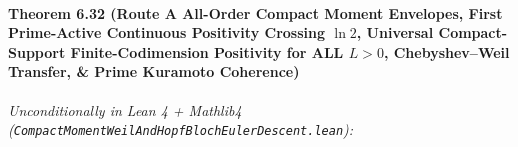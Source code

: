 \documentclass[
  11pt,
]{article}
\begin{document}
\paragraph{\texorpdfstring{Theorem 6.32 (Route A All-Order Compact
Moment Envelopes, First Prime-Active Continuous Positivity Crossing
\(\ln 2\), Universal Compact-Support Finite-Codimension Positivity for
ALL \(L > 0\), Chebyshev--Weil Transfer, \& Prime Kuramoto
Coherence)}{Theorem 6.32 (Route A All-Order Compact Moment Envelopes, First Prime-Active Continuous Positivity Crossing \textbackslash ln 2, Universal Compact-Support Finite-Codimension Positivity for ALL L \textgreater{} 0, Chebyshev--Weil Transfer, \& Prime Kuramoto Coherence)}}\label{theorem-6.32-route-a-all-order-compact-moment-envelopes-first-prime-active-continuous-positivity-crossing-ln-2-universal-compact-support-finite-codimension-positivity-for-all-l-0-chebyshevweil-transfer-prime-kuramoto-coherence}

\emph{Unconditionally in Lean 4 + Mathlib4
(\texttt{CompactMomentWeilAndHopfBlochEulerDescent.lean}):}
\end{document}
